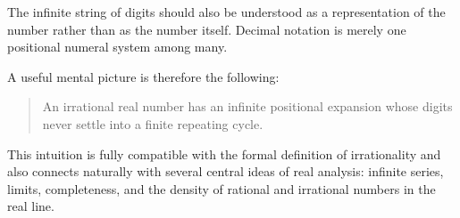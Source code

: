 \documentclass{essay}
\begin{document}
The infinite string of digits should also be understood as a representation of the number rather than as the number itself. Decimal notation is merely one positional numeral system among many.

A useful mental picture is therefore the following:

\begin{quote}
An irrational real number has an infinite positional expansion whose digits never settle into a finite repeating cycle.
\end{quote}

This intuition is fully compatible with the formal definition of irrationality and also connects naturally with several central ideas of real analysis: infinite series, limits, completeness, and the density of rational and irrational numbers in the real line.
\end{document}
